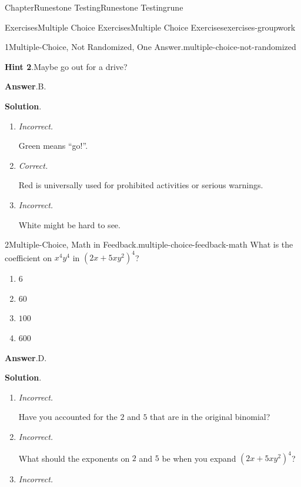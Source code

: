 \documentclass[oneside,10pt,]{book}
\newcommand{\blocktitlefont}{\relax}
\newcommand{\lititle}[1]{{\slshape#1}}
\numberwithin{equation}{section}
\begin{document}
\begin{chapterptx}{Chapter}{Runestone Testing}{}{Runestone Testing}{}{}{rune}
\begin{exercises-section}{Exercises}{Multiple Choice Exercises}{}{Multiple Choice Exercises}{}{}{exercises-groupwork}
\begin{divisionexercise}{1}{Multiple-Choice, Not Randomized, One Answer.}{}{multiple-choice-not-randomized}
\par\smallskip%
\noindent\textbf{\blocktitlefont Hint 2}.\hypertarget{multiple-choice-not-randomized-5}{}\quad{}Maybe go out for a drive?%
\par\smallskip%
\noindent\textbf{\blocktitlefont Answer}.\hypertarget{multiple-choice-not-randomized-6}{}\quad{}B.%
\par\smallskip%
\noindent\textbf{\blocktitlefont Solution}.\hypertarget{multiple-choice-not-randomized-7}{}\quad{}%
\begin{enumerate}[label={\Alph*.}]
\item{}\lititle{Incorrect.}\par%
Green means ``go!''.%
\item{}\lititle{Correct.}\par%
Red is universally used for prohibited activities or serious warnings.%
\item{}\lititle{Incorrect.}\par%
White might be hard to see.%
\end{enumerate}
%
\end{divisionexercise}%
\begin{divisionexercise}{2}{Multiple-Choice, Math in Feedback.}{}{multiple-choice-feedback-math}%
What is the coefficient on \(x^4y^4\) in \((2x+5xy^2)^4\)?%
\par
%
\begin{enumerate}[label={\Alph*.}]
\item{}\(\displaystyle 6\)%
\item{}\(\displaystyle 60\)%
\item{}\(\displaystyle 100\)%
\item{}\(\displaystyle 600\)%
\end{enumerate}
%
\par\smallskip%
\noindent\textbf{\blocktitlefont Answer}.\hypertarget{multiple-choice-feedback-math-3}{}\quad{}D.%
\par\smallskip%
\noindent\textbf{\blocktitlefont Solution}.\hypertarget{multiple-choice-feedback-math-4}{}\quad{}%
\begin{enumerate}[label={\Alph*.}]
\item{}\lititle{Incorrect.}\par%
Have you accounted for the \(2\) and \(5\) that are in the original binomial?%
\item{}\lititle{Incorrect.}\par%
What should the exponents on \(2\) and \(5\) be when you expand \((2x+5xy^2)^4\)?%
\item{}\lititle{Incorrect.}\par%

\end{enumerate}
\end{divisionexercise}
\end{exercises-section}
\end{chapterptx}
\end{document}
